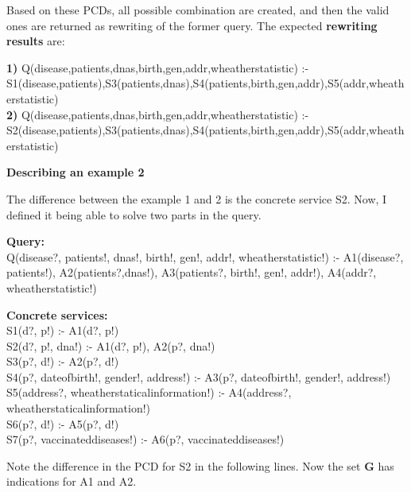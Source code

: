 \documentclass[12pt,a4paper,oneside]{report}
\begin{document}
Based on these PCDs, all possible combination are created, and then the valid ones are returned as rewriting of the former query. The expected \textbf{rewriting results} are:

\begin{flushleft}
\textbf{1) }Q(disease,patients,dnas,birth,gen,addr,wheatherstatistic) :- S1(disease,patients),S3(patients,dnas),S4(patients,birth,gen,addr),S5(addr,wheatherstatistic) \\
\textbf{2) }Q(disease,patients,dnas,birth,gen,addr,wheatherstatistic) :- S2(disease,patients),S3(patients,dnas),S4(patients,birth,gen,addr),S5(addr,wheatherstatistic) \\
\end{flushleft}

\begin{flushleft}
\textbf{Describing an example 2}
\end{flushleft}

The difference between the example 1 and 2 is the concrete service S2. Now, I defined it being able to solve two parts in the query.

\begin{flushleft}
\textbf{Query:} \\
Q(disease?, patients!, dnas!, birth!, gen!, addr!, wheatherstatistic!) :- A1(disease?, patients!), A2(patients?,dnas!), A3(patients?, birth!, gen!, addr!), A4(addr?, wheatherstatistic!) \\
\end{flushleft}

\begin{flushleft}
\textbf{Concrete services:} \\
S1(d?, p!) :- A1(d?, p!)\\
S2(d?, p!, dna!) :- A1(d?, p!), A2(p?, dna!)\\
S3(p?, d!) :- A2(p?, d!)\\
S4(p?, dateofbirth!, gender!, address!) :- A3(p?, dateofbirth!, gender!, address!)\\
S5(address?, wheatherstaticalinformation!) :- A4(address?, wheatherstaticalinformation!)\\
S6(p?, d!) :- A5(p?, d!)\\
S7(p?, vaccinateddiseases!) :- A6(p?, vaccinateddiseases!)\\
\end{flushleft}

Note the difference in the PCD for S2 in the following lines. Now the set \textbf{G} has indications for A1 and A2.
\end{document}
